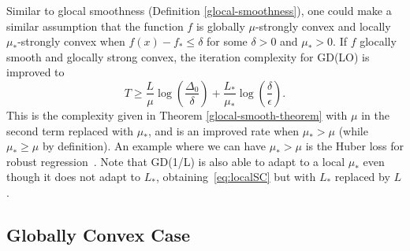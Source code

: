 \documentclass[10pt]{article} %
\begin{document}
Similar to glocal smoothness (Definition \ref{glocal-smoothness}), one could make a similar assumption that the function $f$ is globally $\mu$-strongly convex and locally $\mu_*$-strongly convex when $f(x) - f_* \leq \delta$ for some $\delta > 0$ and $\mu_* > 0$. If $f$ glocally smooth and glocally strong convex, the iteration complexity for GD(LO) is improved to
\begin{equation}
    T \geq 
     \frac{L}{\mu}\log\left(\frac{\Delta_{0}}{\delta}\right) + \frac{L_*}{\mu_*}\log\left(\frac{\delta}{\epsilon}\right). 
     \label{eq:localSC}
\end{equation}
This is the complexity given in Theorem \ref{glocal-smooth-theorem} with $\mu$ in the second term replaced with $\mu_*$, and is an improved rate when $\mu_* > \mu$ (while $\mu_* \geq \mu$ by definition). An example where we can have $\mu_* > \mu$ is the Huber loss for robust regression~\cite{hastie2017elements}. Note that GD(1/L) is also able to adapt to a local $\mu_*$ even though it does not adapt to $L_*$, obtaining~\eqref{eq:localSC} but with $L_*$ replaced by $L$.


\subsection{Globally Convex Case}
\label{local-PL-global-convex-section}
\end{document}
